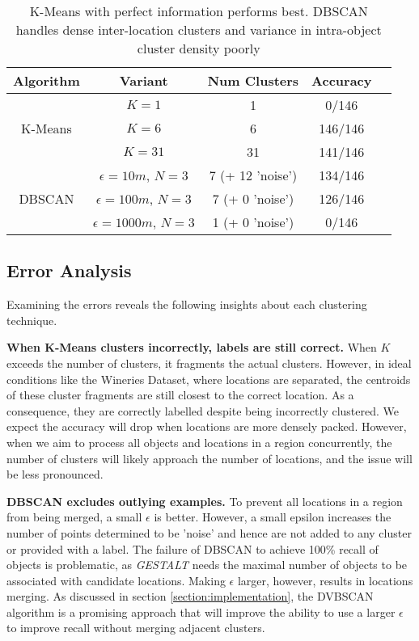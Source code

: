\begin{table}[h!]
	\begin{center}
		\begin{tabular}{ |c|c|c|c|c| } 
			\hline
			Algorithm & Variant & Num Clusters & Accuracy \\
			\hline
			\multirow{3}{4em}{K-Means} & $K=1$ & 1 & 0/146 \\ 
			& $K=6$ & 6 & 146/146 \\ 
			& $K=31$ & 31 & 141/146 \\ 
			\hline
			\multirow{3}{4em}{DBSCAN} & $\epsilon=10m$, $N=3$ & 7 (+ 12 'noise') & 134/146 \\ 
			& $\epsilon=100m$, $N=3$ & 7 (+ 0 'noise') & 126/146 \\ 
			& $\epsilon=1000m$, $N=3$ & 1 (+ 0 'noise') & 0/146 \\ 
			\hline
		\end{tabular}
		\label{table:clustering}
		\caption{K-Means with perfect information performs best. DBSCAN handles dense inter-location clusters and variance in intra-object cluster density poorly}
	\end{center}
\end{table}

\subsection{Error Analysis}
Examining the errors reveals the following insights about each clustering technique. 

\textbf{When K-Means clusters incorrectly, labels are still correct.} When $K$ exceeds the number of clusters, it fragments the actual clusters. 
However, in ideal conditions like the Wineries Dataset, where locations are separated, the centroids of these cluster fragments are still closest to the correct location. 
As a consequence, they are correctly labelled despite being incorrectly clustered. We expect the accuracy will drop when locations are more densely packed. However, when we aim to process all objects and locations in a region concurrently, the number of clusters will likely approach the number of locations, and the issue will be less pronounced. 

\textbf{DBSCAN excludes outlying examples.} To prevent all locations in a region from being merged, a small $\epsilon$ is better. However, a small epsilon increases the number of points determined to be 'noise' and hence are not added to any cluster or provided with a label. 
The failure of DBSCAN to achieve 100\% recall of objects is problematic, as \textit{GESTALT} needs the maximal number of objects to be associated with candidate locations. Making $\epsilon$ larger, however, results in locations merging. As discussed in section \ref{section:implementation}, the DVBSCAN algorithm is a promising approach that will improve the ability to use a larger $\epsilon$ to improve recall without merging adjacent clusters. 

